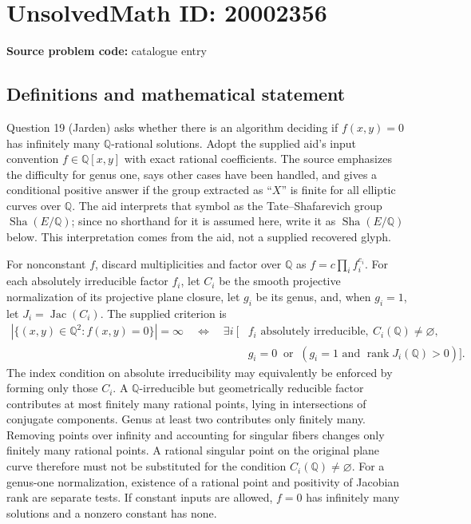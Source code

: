 \documentclass[11pt]{article}
\newcommand{\Q}{\mathbb{Q}}
\begin{document}
\section*{UnsolvedMath ID: 20002356}
\textbf{Source problem code:} catalogue entry
\subsection{Definitions and mathematical statement}
Question 19 (Jarden) asks whether there is an algorithm deciding if $f(x,y)=0$ has infinitely many $\Q$-rational solutions. Adopt the supplied aid's input convention $f\in\Q[x,y]$ with exact rational coefficients. The source emphasizes the difficulty for genus one, says other cases have been handled, and gives a conditional positive answer if the group extracted as ``$X$'' is finite for all elliptic curves over $\Q$. The aid interprets that symbol as the Tate--Shafarevich group $\operatorname{Sha}(E/\Q)$; since no shorthand for it is assumed here, write it as $\operatorname{Sha}(E/\Q)$ below. This interpretation comes from the aid, not a supplied recovered glyph.

For nonconstant $f$, discard multiplicities and factor over $\Q$ as $f=c\prod_i f_i^{e_i}$. For each absolutely irreducible factor $f_i$, let $C_i$ be the smooth projective normalization of its projective plane closure, let $g_i$ be its genus, and, when $g_i=1$, let $J_i=\operatorname{Jac}(C_i)$. The supplied criterion is
\[
\begin{split}
|\{(x,y)\in\Q^2:f(x,y)=0\}|=\infty
\quad\Longleftrightarrow\quad
\exists i\ \bigl[&f_i\text{ absolutely irreducible},\ C_i(\Q)\ne\varnothing,\\
&g_i=0\ \text{ or }\ (g_i=1\text{ and }\operatorname{rank}J_i(\Q)>0)\bigr].
\end{split}
\]
The index condition on absolute irreducibility may equivalently be enforced by forming only those $C_i$. A $\Q$-irreducible but geometrically reducible factor contributes at most finitely many rational points, lying in intersections of conjugate components. Genus at least two contributes only finitely many. Removing points over infinity and accounting for singular fibers changes only finitely many rational points. A rational singular point on the original plane curve therefore must not be substituted for the condition $C_i(\Q)\ne\varnothing$. For a genus-one normalization, existence of a rational point and positivity of Jacobian rank are separate tests. If constant inputs are allowed, $f=0$ has infinitely many solutions and a nonzero constant has none.
\end{document}
